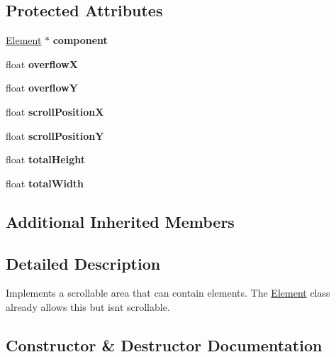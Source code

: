 \subsection*{Protected Attributes}
\begin{DoxyCompactItemize}
\item 
\mbox{\label{class_viewport_a771c72174c19e72d2988d8203bb0bf70}} 
\hyperlink{class_element}{Element} $\ast$ {\bfseries component}
\item 
\mbox{\label{class_viewport_a23c68fffb90641759e39f0a6eddfcca8}} 
float {\bfseries overflowX}
\item 
\mbox{\label{class_viewport_a13662e1986bf472dc8150bfd82193034}} 
float {\bfseries overflowY}
\item 
\mbox{\label{class_viewport_a1b3a096a9c0812c85665bf1991d4e5e1}} 
float {\bfseries scroll\+PositionX}
\item 
\mbox{\label{class_viewport_a0dd61a3009e40e8979110d8075f1962c}} 
float {\bfseries scroll\+PositionY}
\item 
\mbox{\label{class_viewport_ae3d3b8f45b685d9565e5ae4efe70e7dd}} 
float {\bfseries total\+Height}
\item 
\mbox{\label{class_viewport_a111086588062bf7b9097a38bcf0d22d3}} 
float {\bfseries total\+Width}
\end{DoxyCompactItemize}
\subsection*{Additional Inherited Members}


\subsection{Detailed Description}
Implements a scrollable area that can contain elements. The \hyperlink{class_element}{Element} class already allows this but isn\textquotesingle{}t scrollable.  

\subsection{Constructor \& Destructor Documentation}
\mbox{\label{class_viewport_a9fde8f966d9802dd42254acf0ed05386}} 
